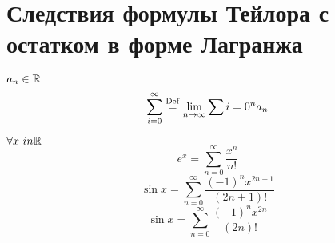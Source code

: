 ﻿\section{Следствия формулы Тейлора с остатком в форме Лагранжа}

\begin{Def}
$a_n \in \mathbb{R}$
$$\sum_{i=0}^\infty \stackrel{\mathrm{Def}}{=} \lim_{n\rightarrow\infty} \sum{i=0}^n a_n$$
\end{Def}

\begin{conseq}
$\forall x\ in \mathbb{R}\;$
$$e^x = \sum_{n=0}^\infty \frac{x^n}{n!}$$
$$\sin x = \sum_{n=0}^\infty \frac{(-1)^n x^{2n+1}}{(2n+1)!}$$
$$\sin x = \sum_{n=0}^\infty \frac{(-1)^n x^{2n}}{(2n)!}$$
\end{conseq}
